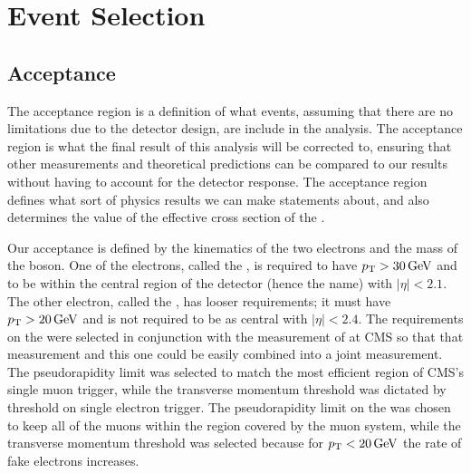 \chapter{Event Selection}
\label{chapter:event_selection}


\section{Acceptance}
\label{sec:acceptance}


The acceptance region is a definition of what events, assuming that there are
no limitations due to the detector design, are include in the analysis. The
acceptance region is what the final result of this analysis will be corrected
to, ensuring that other measurements and theoretical predictions can be
compared to our results without having to account for the detector response.
The acceptance region defines what sort of physics results we can make
statements about, and also determines the value of the effective cross section
of the \Z.

Our acceptance is defined by the kinematics of the two electrons and the mass
of the \Z boson. One of the electrons, called the \CentralElectron, is required
to have $\pt > \SI{30}{\GeV}$ and to be within the central region of the
detector (hence the name) with $|\eta| < 2.1$. The other electron, called the
\ExtendedElectron, has looser requirements; it must have $\pt > \SI{20}{\GeV}$
and is not required to be as central with $|\eta| < 2.4$. The requirements on
the \CentralElectron were selected in conjunction with the \Ztomumu measurement
of \phistar at CMS so that that measurement and this one could be easily
combined into a joint measurement. The pseudorapidity limit was selected to
match the most efficient region of CMS's single muon trigger, while the
transverse momentum threshold was dictated by threshold on single electron
trigger. The pseudorapidity limit on the \ExtendedElectron was chosen to keep
all of the muons within the region covered by the muon system, while the
transverse momentum threshold was selected because for $\pt < \SI{20}{\GeV}$
the rate of fake electrons increases.

